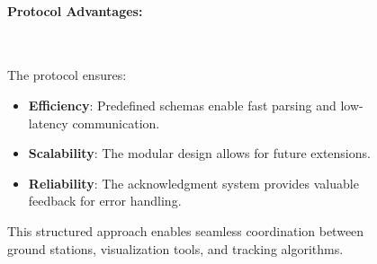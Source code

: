 \begin{figure}[H]
\begin{minipage}{0.5\textwidth}
		\paragraph{Protocol Advantages:} \
	
		The protocol ensures:
		\begin{itemize}
			\item \textbf{Efficiency}: Predefined schemas enable fast parsing and low-latency communication.
			\item \textbf{Scalability}: The modular design allows for future extensions.
			\item \textbf{Reliability}: The acknowledgment system provides valuable feedback for error handling.
		\end{itemize}
		
		This structured approach enables seamless coordination between ground stations, visualization tools, and tracking algorithms.
		

\end{minipage}
\end{figure}
